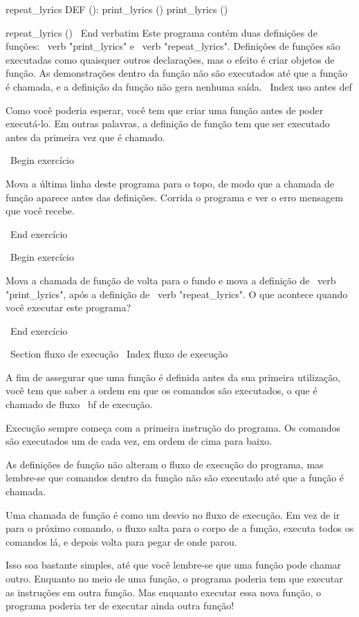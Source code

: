 \documentclass[10pt]{book}
\begin{document}
{repeat_lyrics DEF ():
    print_lyrics ()
    print_lyrics ()

repeat_lyrics ()
\ End {verbatim}
%
Este programa contém duas definições de funções: \ verb "print_lyrics" e
\ verb "repeat_lyrics". Definições de funções são executadas como quaisquer outros
declarações, mas o efeito é criar objetos de função. As demonstrações
dentro da função não são executados até que a função é chamada, e
a definição da função não gera nenhuma saída.
\ Index {uso antes def}

Como você poderia esperar, você tem que criar uma função antes de poder
executá-lo. Em outras palavras, a definição de função tem que ser
executado antes da primeira vez que é chamado.

\ Begin {} exercício

Mova a última linha deste programa
para o topo, de modo que a chamada de função aparece antes das definições. Corrida
o programa e ver o erro
mensagem que você recebe.

\ End {} exercício

\ Begin {} exercício

Mova a chamada de função de volta para o fundo
e mova a definição de \ verb "print_lyrics", após a definição de
\ verb "repeat_lyrics". O que acontece quando você executar este programa?

\ End {} exercício


\ Section {fluxo de execução}
\ Index {fluxo de execução}

A fim de assegurar que uma função é definida antes da sua primeira utilização,
você tem que saber a ordem em que os comandos são executados, o que é
chamado de fluxo {\ bf de execução}.

Execução sempre começa com a primeira instrução do programa.
Os comandos são executados um de cada vez, em ordem de cima para baixo.

As definições de função não alteram o fluxo de execução do
programa, mas lembre-se que comandos dentro da função não são
executado até que a função é chamada.

Uma chamada de função é como um desvio no fluxo de execução. Em vez de
ir para o próximo comando, o fluxo salta para o corpo de
a função, executa todos os comandos lá, e depois volta
para pegar de onde parou.

Isso soa bastante simples, até que você lembre-se que uma função pode
chamar outro. Enquanto no meio de uma função, o programa poderia
tem que executar as instruções em outra função. Mas enquanto
executar essa nova função, o programa poderia ter de executar ainda
outra função!

}
\end{document}
